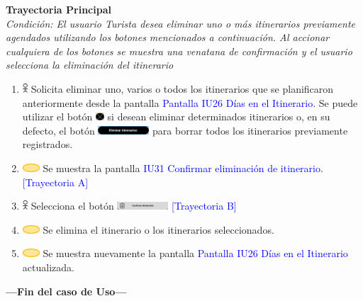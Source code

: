 \textbf{Trayectoria Principal}\\
\textit{Condición: El usuario Turista desea eliminar uno o más itinerarios previamente agendados utilizando los botones mencionados a continuación. Al accionar cualquiera de los botones se muestra una venatana de confirmación y el usuario selecciona la eliminación del itinerario}
\begin{enumerate}
    \item \includegraphics[width=0.0150\textwidth]{Figuras/persona.png} Solicita eliminar uno, varios o todos los itinerarios que se planificaron anteriormente desde la pantalla {\textcolor{blue}{Pantalla IU26 Días en el Itinerario}}. Se puede utilizar el botón \includegraphics[width=0.0250\textwidth]{ComponentesCU/Eliminar.PNG} si desean eliminar determinados itinerarios o, en su defecto, el botón \includegraphics[width=0.150\textwidth]{ComponentesCU/EliminarItinerarios.PNG} para borrar todos los itinerarios previamente registrados.
    \item \includegraphics[width=0.0500\textwidth]{Figuras/sistema.png} Se muestra la pantalla {\textcolor{blue}{IU31 Confirmar eliminación de itinerario}}.{\textcolor{blue}{[Trayectoria A]}}
    \item \includegraphics[width=0.0150\textwidth]{Figuras/persona.png} Selecciona el botón  \includegraphics[width=0.150\textwidth]{ComponentesCU/img2.png} {\textcolor{blue}{[Trayectoria B]}}
    \item \includegraphics[width=0.0500\textwidth]{Figuras/sistema.png} Se elimina el itinerario o los itinerarios seleccionados.
    \item \includegraphics[width=0.0500\textwidth]{Figuras/sistema.png} Se muestra nuevamente la pantalla {\textcolor{blue}{Pantalla IU26 Días en el Itinerario}} actualizada.
\end{enumerate}
\textbf{---Fin del caso de Uso---}
\vspace{15pt}

